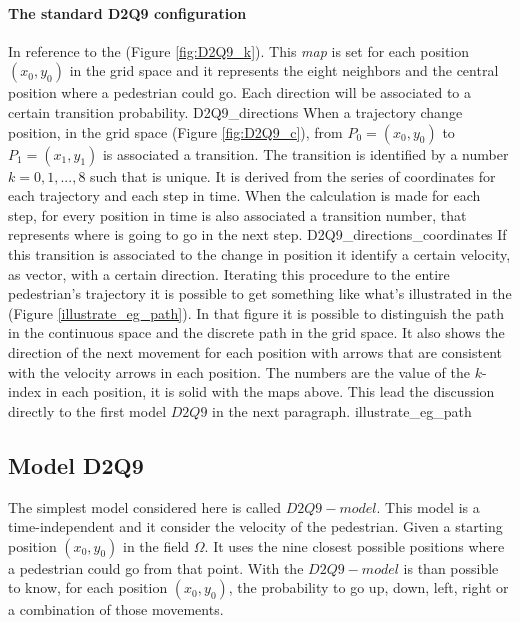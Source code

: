 \documentclass[class=article, crop=false]{standalone}
\begin{document}
\paragraph{The standard D2Q9 configuration} 
In reference to the (Figure \ref{fig:D2Q9_k}).
This \emph{map} is set for each position $(x_0, y_0)$ in the grid space and it represents the eight neighbors and the central position where a pedestrian could go.
Each direction will be associated to a certain transition probability.
{D2Q9_directions}
When a trajectory change position, in the grid space (Figure \ref{fig:D2Q9_c}), from $P_0=(x_0, y_0)$ to $P_1=(x_1, y_1)$ is associated a transition.
The transition is identified by a number $k = 0,1,...,8$ such that is unique.
It is derived from the series of coordinates for each trajectory and each step in time.
When the calculation is made for each step, for every position in time is also associated a transition number, that represents where is going to go in the next step.
{D2Q9_directions_coordinates}
If this transition is associated to the change in position it identify a certain velocity, as vector, with a certain direction.
Iterating this procedure to the entire pedestrian's trajectory it is possible to get something like what's illustrated in the (Figure \ref{illustrate_eg_path}).
In that figure it is possible to distinguish the path in the continuous space and the discrete path in the grid space.
It also shows the direction of the next movement for each position with arrows that are consistent with the velocity arrows in each position.
The numbers are the value of the $k$-index in each position, it is solid with the maps above.
This lead the discussion directly to the first model $D2Q9$ in the next paragraph.
{illustrate_eg_path}




\subsection{Model D2Q9} \label{chap:Model_D2Q9}
The simplest model considered here is called $D2Q9-model$.
This model is a time-independent and it consider the velocity of the pedestrian.
Given a starting position $(x_0, y_0)$ in the field $\Omega$.
It uses the nine closest possible positions where a pedestrian could go from that point.
With the $D2Q9-model$ is than possible to know, for each position $(x_0, y_0)$, the probability to go up, down, left, right or a combination of those movements.
\end{document}
